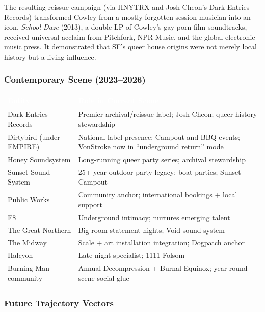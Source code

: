 \documentclass[11pt,letterpaper]{article}
\newcommand{\tableheader}[1]{\textbf{\sffamily\textcolor{white}{#1}}}
\begin{document}
The resulting reissue campaign (via HNYTRX and Josh Cheon's Dark Entries Records) transformed Cowley from a mostly-forgotten session musician into an icon. \textit{School Daze} (2013), a double-LP of Cowley's gay porn film soundtracks, received universal acclaim from Pitchfork, NPR Music, and the global electronic music press. It demonstrated that SF's queer house origins were not merely local history but a living influence.

\subsubsection{Contemporary Scene (2023--2026)}

\begin{center}
\begin{tabularx}{\textwidth}{L{3.5cm}X}
\toprule
{}
\tableheader{Entity} & \tableheader{Role in Current Scene} \\
\midrule
Dark Entries Records & Premier archival/reissue label; Josh Cheon; queer history stewardship \\
Dirtybird (under EMPIRE) & National label presence; Campout and BBQ events; VonStroke now in ``underground return'' mode \\
Honey Soundsystem & Long-running queer party series; archival stewardship \\
Sunset Sound System & 25+ year outdoor party legacy; boat parties; Sunset Campout \\
Public Works & Community anchor; international bookings + local support \\
F8 & Underground intimacy; nurtures emerging talent \\
The Great Northern & Big-room statement nights; Void sound system \\
The Midway & Scale + art installation integration; Dogpatch anchor \\
Halcyon & Late-night specialist; 1111 Folsom \\
Burning Man community & Annual Decompression + Burnal Equinox; year-round scene social glue \\
\bottomrule
\end{tabularx}
\end{center}

\subsubsection{Future Trajectory Vectors}
\end{document}
